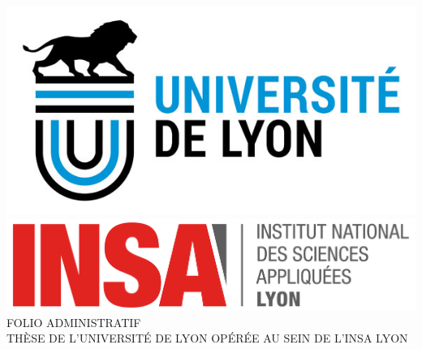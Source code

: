 \begin{center}
  \includegraphics[height=.6in]{../resources/univ-lyon}%
  \includegraphics[height=.6in]{../resources/insa}\\[3pt]%
  \fontsize{14pt}{14pt}\selectfont%
  \MakeUppercase{FOLIO ADMINISTRATIF}\\[3pt]%
  \MakeUppercase{Thèse de l'Université de Lyon opérée au sein de l'Insa Lyon}
\end{center}

